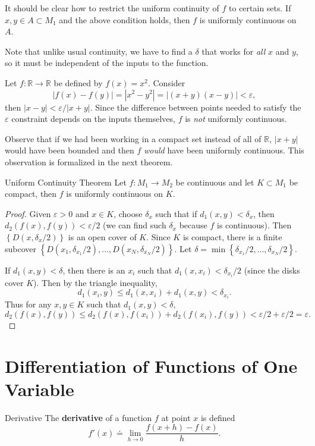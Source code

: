 \documentclass[10pt]{report}
\begin{document}
It should be clear how to restrict the uniform continuity of $f$ to certain sets. If $x,y \in A \subset M_1$ and the above condition holds, then $f$ is uniformly continuous on $A$.

Note that unlike usual continuity, we have to find a $\delta$ that works for \textit{all} $x$ and $y$, so it must be independent of the inputs to the function.

\begin{ex}{}{}
	Let $f:\mathbb{R}\to\mathbb{R}$ be defined by $f(x) = x^2$. Consider \[|f(x)-f(y)| = |x^2-y^2| = |(x+y)(x-y)| < \varepsilon,\]
	then $|x-y| < \varepsilon/|x+y|$. Since the difference between points needed to satisfy the $\varepsilon$ constraint depends on the inputs themselves, $f$ is \textit{not} uniformly continuous.
\end{ex}

Observe that if we had been working in a compact set instead of all of $\mathbb{R}$, $|x+y|$ would have been bounded and then $f$ \textit{would} have been uniformly continuous. This observation is formalized in the next theorem.

\begin{thrm}{Uniform Continuity Theorem}{}
Let $f:M_1\to M_2$ be continuous and let $K \subset M_1$ be compact, then $f$ is uniformly continuous on $K$.
\end{thrm}
\begin{proof}
	Given $\varepsilon>0$ and $x \in K$, choose $\delta_x$ such that if $d_1(x,y) < \delta_x$, then $d_2(f(x), f(y)) < \varepsilon/2$ (we can find such $\delta_x$ because $f$ is continuous). Then $\left\{ D(x,\delta_x/2) \right\}$ is an open cover of $K$. Since $K$ is compact, there is a finite subcover $\left\{ D(x_1,\delta_{x_1}/2), \dots, D(x_N,\delta_{x_N}/2) \right\}$. Let $\delta = \min\left\{ \delta_{x_1}/2, \dots, \delta_{x_N}/2 \right\}$.

	If $d_1(x,y) < \delta$, then there is an $x_i$ such that $d_1(x,x_i) < \delta_{x_i}/2$ (since the disks cover $K$). Then by the triangle inequality,
	\[
		d_1(x_i,y) \leq d_1(x,x_i) + d_1(x,y) < \delta_{x_i}.
	\] 
	Thus for any $x,y \in K$ such that $d_1(x,y) < \delta$,
	\[
		d_2(f(x),f(y)) \leq d_2(f(x), f(x_i)) + d_2(f(x_i),f(y)) < \varepsilon/2 + \varepsilon/2 = \varepsilon.
	\] 
\end{proof}



\section{Differentiation of Functions of One Variable}
\begin{defn}{Derivative}{}
The \textbf{derivative} of a function $f$ at point $x$ is defined
\[
	f'(x) \doteq \lim_{h \to 0} \frac{f(x+h)-f(x)}{h}.
\] 
\end{defn}
\end{document}
